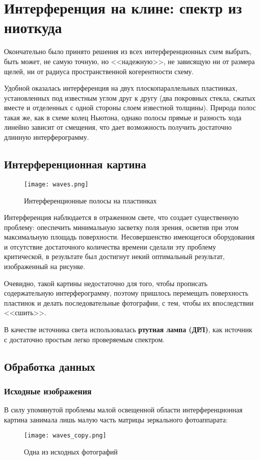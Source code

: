 \documentclass{urticle}
\begin{document}
\section*{Интерференция на клине: спектр из ниоткуда}
	Окончательно было принято решения из всех интерференционных схем выбрать, быть может, не самую точную, но <<надежную>>, не зависящую ни от размера щелей, ни от радиуса пространственной когерентности схему.
	
	Удобной оказалась интерференция на двух плоскопараллельных пластинках, установленных под известным углом друг к другу (два покровных стекла, сжатых вместе и отделенных с одной стороны слоем известной толщины). Природа полос такая же, как в схеме колец Ньютона, однако полосы прямые и разность хода линейно зависит от смещения, что дает возможность получить достаточно длинную интерферограмму.
	
	\subsection*{Интерференционная картина}
	
	\begin{figure}[H]
		\centering
  		\texttt{[image: waves.png]}
  		\caption{Интерференционные полосы на пластинках}
	\end{figure}
	
	Интерференция наблюдается в отраженном свете, что создает существенную проблему: опеспечить минимальную засветку поля зрения, осветив при этом максимальную площадь поверхности. Несовершенство имеющегося оборудования и отсутствие достаточного количества времени сделали эту проблему критической, в результате был достигнут некий оптимальный результат, изображенный на рисунке.
	
	Очевидно, такой картины недостаточно для того, чтобы прописать содержательную интерферограмму, поэтому пришлось перемещать поверхность пластинок и делать последовательные фотографии, с тем, чтобы их впоследствии <<сшить>>. 
	
	В качестве источника света использовалась \textbf{ртутная лампа (ДРЛ)}, как источник с достаточно простым легко проверяемым спектром.

\newpage
	\subsection*{Обработка данных}
	
	\subsubsection*{Исходные изображения}
	В силу упомянутой проблемы малой освещенной области интерференционная картина занимала лишь малую часть матрицы зеркального фотоаппарата:
	\begin{figure}[H]
	\centering
  	\texttt{[image: waves\_copy.png]}
  \caption{Одна из исходных фотографий}
  \end{figure}
  
\end{document}

